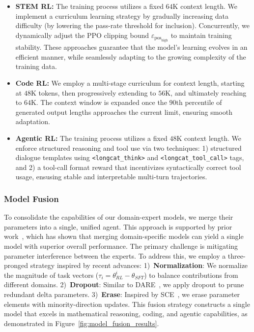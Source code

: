 \begin{itemize}
    \item\textbf{STEM RL:} The training process utilizes a fixed $64$K context length. We implement a curriculum learning strategy by gradually increasing data difficulty (by lowering the pass-rate threshold for inclusion). Concurrently, we dynamically adjust the PPO clipping bound $\varepsilon_{\text{pos}_{\text{high}}}$ to maintain training stability. These approaches guarantee that the model's learning evolves in an efficient manner, while seamlessly adapting to the growing complexity of the training data.
    \item\textbf{Code RL:} We employ a multi-stage curriculum for context length, starting at $48$K tokens, then progressively extending to $56$K, and ultimately reaching to $64$K. The context window is expanded once the $90$th percentile of generated output lengths approaches the current limit, ensuring smooth adaptation.
    \item\textbf{Agentic RL:} The training process utilizes a fixed $48$K context length. We enforce structured reasoning and tool use via two techniques: 1) structured dialogue templates using  \texttt{<longcat\_think>} and \texttt{<longcat\_tool\_call>} tags, and 2) a tool-call format reward that incentivizes syntactically correct tool usage, ensusing stable and interpretable multi-turn trajectories.
\end{itemize}

\subsubsection{Model Fusion}
To consolidate the capabilities of our domain-expert models, we merge their parameters into a single, unified agent. 
This approach is supported by prior work~\citep{yadav2023ties, DBLP:conf/naacl/LeeLWWCW25}, which has shown that merging domain-specific models can yield a single model with superior overall performance. 
The primary challenge is mitigating parameter interference between the experts. 
To address this, we employ a three-pronged strategy inspired by recent advances:
1)~\textbf{Normalization}: We normalize the magnitude of task vectors ($\tau_{i}=\theta^{i}_{RL}-\theta_{SFT}$) to balance contributions from different domains.
2)~\textbf{Dropout}: Similar to DARE~\citep{yu2024language}, we apply dropout to prune redundant delta parameters.
3)~\textbf{Erase}: Inspired by SCE~\citep{DBLP:journals/corr/abs-2408-07990}, we erase parameter elements with minority-direction updates.
This fusion strategy constructs a single model that excels in mathematical reasoning, coding, and agentic capabilities, as demonstrated in Figure~\ref{fig:model_fusion_results}.


